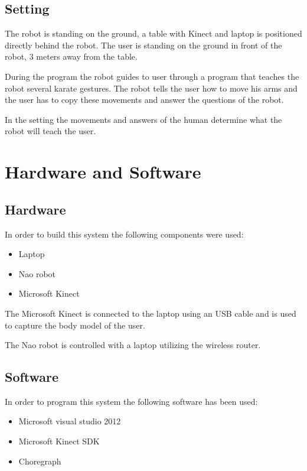 \documentclass[10pt,a4paper,oneside]{scrartcl}
\begin{document}
\subsection{Setting}
The robot is standing on the ground, a table with Kinect and laptop is positioned directly behind the robot. 
The user is standing on the ground in front of the robot, 3 meters away from the table. 

During the program the robot guides to user through a program that teaches the robot several karate gestures. The robot tells the user how to move his arms and the user has to copy these movements and answer the questions of the robot. 

In the setting the movements and answers of the human determine what the robot will teach the user. 
\section{Hardware and Software}

\subsection{Hardware}
In order to build this system the following components were used:
\begin{itemize}
  \item Laptop
  \item Nao robot
  \item Microsoft Kinect
\end{itemize}

The Microsoft Kinect is connected to the laptop using an USB cable and is used to capture the body model of the user. 

The Nao robot is controlled with a laptop utilizing the wireless router. 

\subsection{Software}
In order to program this system the following software has been used:
\begin{itemize}
  \item Microsoft visual studio 2012
  \item Microsoft Kinect SDK
  \item Choregraph
\end{itemize}
\end{document}
